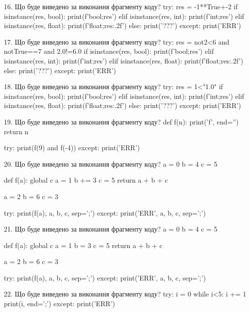 \documentclass[11pt]{article}
\begin{document}

16. Що буде виведено за виконання фрагменту коду?
try:
    res = -1**True+-2
    if isinstance(res, bool):
        print(f'bool;{res}')
    elif isinstance(res, int):
        print(f'int;{res}')
    elif isinstance(res, float):
        print(f'float;{res:.2f}')
    else:
        print('???')
except:
    print('ERR')


17. Що буде виведено за виконання фрагменту коду?
try:
    res = not2<6 and notTrue==7 and 2.0!=6.0
    if isinstance(res, bool):
        print(f'bool;{res}')
    elif isinstance(res, int):
        print(f'int;{res}')
    elif isinstance(res, float):
        print(f'float;{res:.2f}')
    else:
        print('???')
except:
    print('ERR')


18. Що буде виведено за виконання фрагменту коду?
try:
    res = 1<"1.0"
    if isinstance(res, bool):
        print(f'bool;{res}')
    elif isinstance(res, int):
        print(f'int;{res}')
    elif isinstance(res, float):
        print(f'float;{res:.2f}')
    else:
        print('???')
except:
    print('ERR')


19. Що буде виведено за виконання фрагменту коду?
def f(n):
    print('f', end='')
    return n

try:
    print(f(9) and f(-4))
except:
    print('ERR')


20. Що буде виведено за виконання фрагменту коду?
a = 0
b = 4
c = 5

def f(a):
global c    a = 1
    b += 3
    c = 5
    return a + b + c

a = 2
b = 6
c = 3

try:
    print(f(a), a, b, c, sep=';')
except:
    print('ERR', a, b, c, sep=';')


21. Що буде виведено за виконання фрагменту коду?
a = 0
b = 4
c = 5

def f(a):
global c    a = 1
    b = 3
    c = 5
    return a + b + c

a = 2
b = 6
c = 3

try:
    print(f(a), a, b, c, sep=';')
except:
    print('ERR', a, b, c, sep=';')


22. Що буде виведено за виконання фрагменту коду?
try:
    i = 0
    while i<5:
        i += 1
    print(i, end=';')
except:
    print('ERR')
\end{document}
